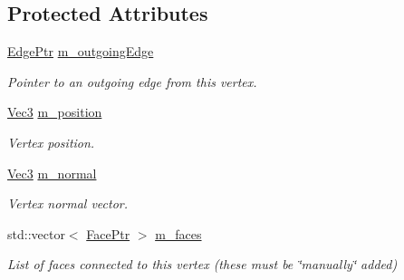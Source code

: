 \subsection*{Protected Attributes}
\begin{DoxyCompactItemize}
\item 
\mbox{\label{classDcel_1_1VertexT_ab02281ef4c214c2ea5567dae97864846}} 
\hyperlink{classDcel_1_1VertexT_a7c049a24ac43b9750578e4f4ed543831}{Edge\+Ptr} \hyperlink{classDcel_1_1VertexT_ab02281ef4c214c2ea5567dae97864846}{m\+\_\+outgoing\+Edge}
\begin{DoxyCompactList}\small\item\em Pointer to an outgoing edge from this vertex. \end{DoxyCompactList}\item 
\mbox{\label{classDcel_1_1VertexT_a1980e54dcfd5cefdebac129580028015}} 
\hyperlink{classDcel_1_1VertexT_a6e073dc7426756edef5594816be6e7c7}{Vec3} \hyperlink{classDcel_1_1VertexT_a1980e54dcfd5cefdebac129580028015}{m\+\_\+position}
\begin{DoxyCompactList}\small\item\em Vertex position. \end{DoxyCompactList}\item 
\mbox{\label{classDcel_1_1VertexT_a509216af6d1d2ca84d1d774b4a6c7659}} 
\hyperlink{classDcel_1_1VertexT_a6e073dc7426756edef5594816be6e7c7}{Vec3} \hyperlink{classDcel_1_1VertexT_a509216af6d1d2ca84d1d774b4a6c7659}{m\+\_\+normal}
\begin{DoxyCompactList}\small\item\em Vertex normal vector. \end{DoxyCompactList}\item 
\mbox{\label{classDcel_1_1VertexT_ad0a8f9c1015b62c891ad2d877d6b8802}} 
std\+::vector$<$ \hyperlink{classDcel_1_1VertexT_a5acb4c66c49319683c71f52e56ad8e8a}{Face\+Ptr} $>$ \hyperlink{classDcel_1_1VertexT_ad0a8f9c1015b62c891ad2d877d6b8802}{m\+\_\+faces}
\begin{DoxyCompactList}\small\item\em List of faces connected to this vertex (these must be \char`\"{}manually\char`\"{} added) \end{DoxyCompactList}\end{DoxyCompactItemize}



